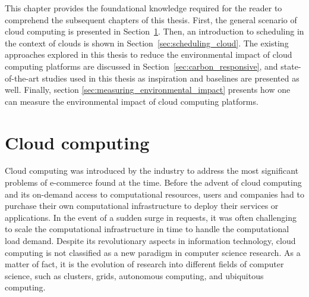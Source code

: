 This chapter provides the foundational knowledge required for the reader to comprehend the subsequent chapters of this thesis. First, the general scenario of cloud computing is presented in Section~\ref{sec:cloud}. Then, an introduction to scheduling in the context of clouds is shown in Section~\ref{sec:scheduling_cloud}. The existing approaches explored in this thesis to reduce the environmental impact of cloud computing platforms are discussed in Section~\ref{sec:carbon_responsive}, and state-of-the-art studies used in this thesis as inspiration and baselines are presented as well. Finally, section \ref{sec:measuring_environmental_impact} presents how one can measure the environmental impact of cloud computing platforms.

\section{Cloud computing}

\label{sec:cloud}

Cloud computing was introduced by the industry to address the most significant problems of e-commerce found at the time. Before the advent of cloud computing and its on-demand access to computational resources, users and companies had to purchase their own computational infrastructure to deploy their services or applications. In the event of a sudden surge in requests, it was often challenging to scale the computational infrastructure in time to handle the computational load demand. Despite its revolutionary aspects in information technology, cloud computing is not classified as a new paradigm in computer science research. As a matter of fact, it is the evolution of research into different fields of computer science, such as clusters, grids, autonomous computing, and ubiquitous computing.


